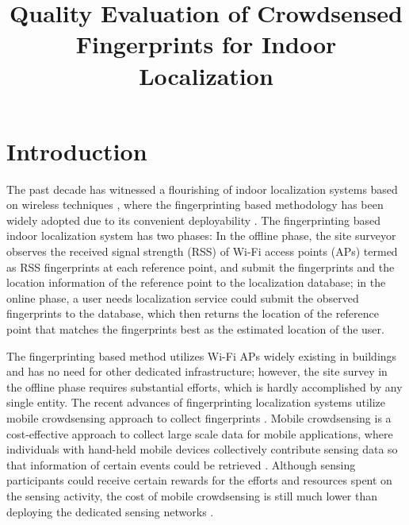 \documentclass[10pt,conference,compsocconf,letterpaper]{IEEEtran}
\begin{document}
\title{Quality Evaluation of Crowdsensed Fingerprints for Indoor Localization}

%
%

\maketitle



\begin{abstract}

\end{abstract}


\section{Introduction}\label{sectionintro}
The past decade has witnessed a flourishing of indoor localization systems based on wireless techniques \cite{ rsscsi}, where the fingerprinting based methodology has been widely adopted due to its convenient deployability \cite{ mobicom04, horus }. The fingerprinting based indoor localization system has two phases: In the offline phase, the site surveyor observes the received signal strength (RSS) of Wi-Fi access points (APs) termed as RSS fingerprints at each reference point, and submit the fingerprints and the location information of the reference point to the localization database; in the online phase, a user needs localization service could submit the observed fingerprints to the database, which then returns the location of the reference point that matches the fingerprints best as the estimated location of the user.   

The fingerprinting based method utilizes Wi-Fi APs widely existing in buildings and has no need for other dedicated infrastructure; however, the site survey in the offline phase requires substantial efforts, which is hardly accomplished by any single entity. The recent advances of fingerprinting localization systems utilize mobile crowdsensing approach to collect fingerprints \cite{ wen2015fundamental, Chenshu14, luo2014piloc, shen2013walkie, ez10, Chintalapudi10}. Mobile crowdsensing is a cost-effective approach to collect large scale data for mobile applications, where individuals with hand-held mobile devices collectively contribute sensing data so that information of certain events could be retrieved \cite{crowdsensing, postedpricing}. Although sensing participants could receive certain rewards for the efforts and resources spent on the sensing activity, the cost of mobile crowdsensing is still much lower than deploying the dedicated sensing networks \cite{ crowdsensing}. 
\end{document}
